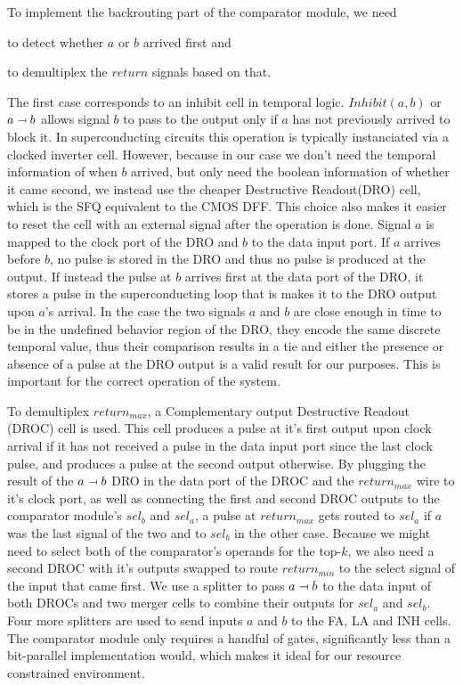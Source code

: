 \documentclass{article}
\newcommand{\inhib}{\relbar\mapsfromchar}
\begin{document}
To implement the backrouting part of the comparator module,
we need \begin{enumerate*}[label=\emph{\alph*})] \item to
    detect whether $a$ or $b$ arrived first and \item to
      demultiplex the $return$ signals based on that.
\end{enumerate*} The first case corresponds to an inhibit
cell in temporal logic. $Inhibit(a,b)$ or $a \inhib b$
allows signal $b$ to pass to the output only if $a$ has not
previously arrived to block it. In superconducting circuits
this operation is typically instanciated via a clocked
inverter cell. However, because in our case we don't need
the temporal information of when $b$ arrived, but only need
the boolean information of whether it came second, we
instead use the cheaper Destructive Readout(DRO) cell, which
is the SFQ equivalent to the CMOS DFF. This choice also
makes it easier to reset the cell with an external signal
after the operation is done. Signal $a$ is mapped to the
clock port of the DRO and $b$ to the data input
port. If $a$ arrives before $b$, no pulse is stored in the
DRO and thus no pulse is produced at the output. If instead
the pulse at $b$ arrives first at the data port of the DRO,
it stores a pulse in the superconducting loop that is makes
it to the DRO output upon $a$'s arrival. In the case the two
signals $a$ and $b$ are close enough in time to be in the
undefined behavior region of the DRO, they encode the same
discrete temporal value, thus their comparison results in a
tie and either the presence or absence of a pulse at the DRO
output is a valid result for our purposes. This is important
for the correct operation of the system.

To demultiplex $return_{max}$, a Complementary output
Destructive Readout (DROC) cell is used. This cell produces
a pulse at it's first output upon clock arrival if it has
not received a pulse in the data input port since the last
clock pulse, and produces a pulse at the second output
otherwise. By plugging the result of the $a \inhib b$ DRO in
the data port of the DROC and the $return_{max}$ wire to
it's clock port, as well as connecting the first and second
DROC outputs to the comparator module's $sel_b$ and $sel_a$,
a pulse at $return_{max}$ gets routed to $sel_a$ if $a$ was
the last signal of the two and to $sel_b$ in the other case.
Because we might need to select both of the comparator's
operands for the top-$k$, we also need a second DROC with
it's outputs swapped to route $return_{min}$ to the select
signal of the input that came first. We use a splitter to
pass $a \inhib b$ to the data input of both DROCs and two
merger cells to combine their outputs for $sel_a$ and
$sel_b$. Four more splitters are used to send inputs $a$ and
$b$ to the FA, LA and INH cells. The comparator module only
requires a handful of gates, significantly less than a
bit-parallel implementation would, which makes it ideal for
our resource constrained environment.
\end{document}
